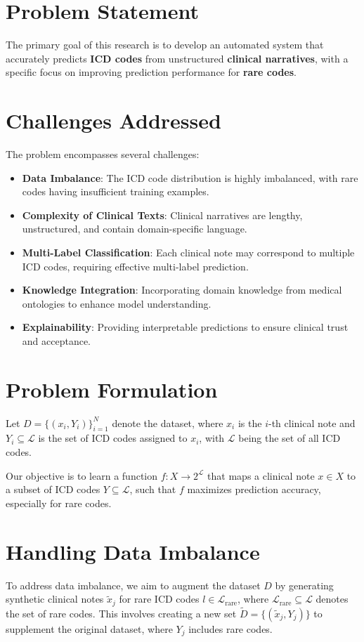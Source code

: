 \documentclass[12pt,a4paper]{report}
\begin{document}
\section{Problem Statement}
The primary goal of this research is to develop an automated system that accurately predicts \textbf{ICD codes} from unstructured \textbf{clinical narratives}, with a specific focus on improving prediction performance for \textbf{rare codes}.

\section{Challenges Addressed}
The problem encompasses several challenges:
\begin{itemize}
    \item \textbf{Data Imbalance}: The ICD code distribution is highly imbalanced, with rare codes having insufficient training examples.
    \item \textbf{Complexity of Clinical Texts}: Clinical narratives are lengthy, unstructured, and contain domain-specific language.
    \item \textbf{Multi-Label Classification}: Each clinical note may correspond to multiple ICD codes, requiring effective multi-label prediction.
    \item \textbf{Knowledge Integration}: Incorporating domain knowledge from medical ontologies to enhance model understanding.
    \item \textbf{Explainability}: Providing interpretable predictions to ensure clinical trust and acceptance.
\end{itemize}

\section{Problem Formulation}
Let \( D = \{(x_i, Y_i)\}_{i=1}^N \) denote the dataset, where \( x_i \) is the \( i \)-th clinical note and \( Y_i \subseteq \mathcal{L} \) is the set of ICD codes assigned to \( x_i \), with \( \mathcal{L} \) being the set of all ICD codes.

Our objective is to learn a function \( f: X \rightarrow 2^{\mathcal{L}} \) that maps a clinical note \( x \in X \) to a subset of ICD codes \( Y \subseteq \mathcal{L} \), such that \( f \) maximizes prediction accuracy, especially for rare codes.

\section{Handling Data Imbalance}
To address data imbalance, we aim to augment the dataset \( D \) by generating synthetic clinical notes \( \tilde{x}_j \) for rare ICD codes \( l \in \mathcal{L}_{\text{rare}} \), where \( \mathcal{L}_{\text{rare}} \subseteq \mathcal{L} \) denotes the set of rare codes. This involves creating a new set \( \tilde{D} = \{(\tilde{x}_j, Y_j)\} \) to supplement the original dataset, where \( Y_j \) includes rare codes.
\end{document}
